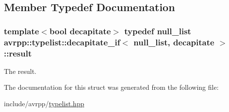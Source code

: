 \subsection{Member Typedef Documentation}
\hypertarget{structavrpp_1_1typelist_1_1decapitate__if_3_01null__list_00_01decapitate_01_4_ab919aa890d96ad3e2fc615a9902bb630}{
\subsubsection[{result}]{\setlength{\rightskip}{0pt plus 5cm}template$<$bool decapitate$>$ typedef {\bf null\_\-list} avrpp::typelist::decapitate\_\-if$<$ {\bf null\_\-list}, decapitate $>$::{\bf result}}}
\label{structavrpp_1_1typelist_1_1decapitate__if_3_01null__list_00_01decapitate_01_4_ab919aa890d96ad3e2fc615a9902bb630}


The result. 



The documentation for this struct was generated from the following file:\begin{DoxyCompactItemize}
\item 
include/avrpp/\hyperlink{typelist_8hpp}{typelist.hpp}\end{DoxyCompactItemize}
